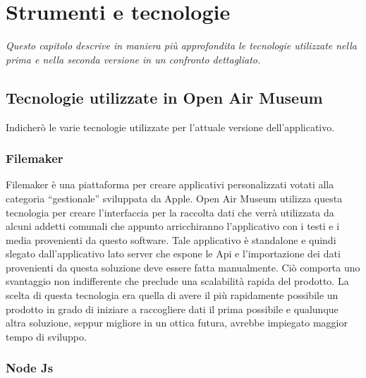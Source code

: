 \chapter{Strumenti e tecnologie}
\label{cha:intro}
\vspace{5mm}

\emph{Questo capitolo descrive in maniera più approfondita le tecnologie utilizzate nella prima e nella seconda versione in un confronto dettagliato.}

\section{Tecnologie utilizzate in Open Air Museum}\vspace{5mm}

Indicherò le varie tecnologie utilizzate per l'attuale versione dell'applicativo.\vspace{5mm}

\subsection{Filemaker}\vspace{5mm}

Filemaker è una piattaforma per creare applicativi personalizzati votati alla categoria “gestionale” sviluppata da Apple. Open Air Museum utilizza questa tecnologia per creare l’interfaccia per la raccolta dati che verrà utilizzata da alcuni addetti comunali che appunto arricchiranno l’applicativo con i testi e i media provenienti da questo software. Tale applicativo è standalone e quindi slegato dall’applicativo lato server che espone le Api e l’importazione dei dati provenienti da questa soluzione deve essere fatta manualmente. Ciò comporta uno svantaggio non indifferente che preclude una scalabilità rapida del prodotto. La scelta di questa tecnologia era quella di avere il più rapidamente possibile un prodotto in grado di iniziare a raccogliere dati il prima possibile e qualunque altra soluzione, seppur migliore in un ottica futura, avrebbe impiegato maggior tempo di sviluppo.\vspace{5mm}

\subsection{Node Js}\vspace{5mm}

